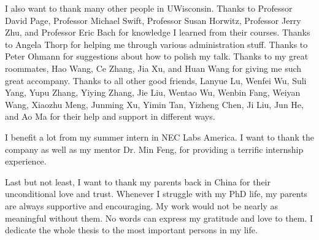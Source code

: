 I also want to thank many other people in UWisconsin. 
Thanks to Professor David Page, Professor Michael Swift, Professor Susan Horwitz, 
Professor Jerry Zhu, and Professor Eric Bach for knowledge I learned from their courses. 
Thanks to Angela Thorp for helping me through various administration stuff. 
Thanks to Peter Ohmann for suggestions about how to polish my talk. 
Thanks to my great roommates, Hao Wang, Ce Zhang, Jia Xu, and Huan Wang for giving me such great accompany. 
Thanks to all other good friends, Lanyue Lu, Wenfei Wu, Suli Yang, Yupu Zhang, Yiying Zhang, 
Jie Liu, Wentao Wu, Wenbin Fang, Weiyan Wang, Xiaozhu Meng, Junming Xu, Yimin Tan, Yizheng Chen, Ji Liu, Jun He, and Ao Ma for their help and support in different ways. 

I benefit a lot from my summer intern in NEC Labs America. 
I want to thank the company as well as my mentor Dr. Min Feng, for providing a terrific internship experience. 
 
Last but not least, I want to thank my parents back in China for their unconditional love and trust. 
Whenever I struggle with my PhD life, my parents are always supportive and encouraging. 
My work would not be nearly as meaningful without them. 
No words can express my gratitude and love to them. 
I dedicate the whole thesis to the most important persons in my life.  
